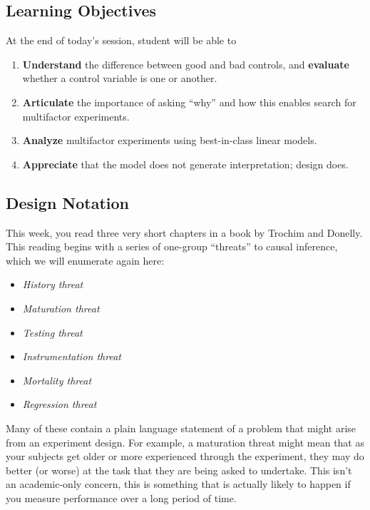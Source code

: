 \documentclass[
]{article}
\providecommand{\tightlist}{%
  \setlength{\itemsep}{0pt}\setlength{\parskip}{0pt}}
\theoremstyle{definition}
\theoremstyle{definition}
\theoremstyle{definition}
\theoremstyle{definition}
\theoremstyle{remark}
\begin{document}
\subsection{Learning Objectives}\label{learning-objectives-6}

At the end of today's session, student will be able to

\begin{enumerate}
\def\labelenumi{\arabic{enumi}.}
\tightlist
\item
  \textbf{Understand} the difference between good and bad controls, and \textbf{evaluate} whether a control variable is one or another.
\item
  \textbf{Articulate} the importance of asking ``why'' and how this enables search for multifactor experiments.
\item
  \textbf{Analyze} multifactor experiments using best-in-class linear models.
\item
  \textbf{Appreciate} that the model does not generate interpretation; design does.
\end{enumerate}

\subsection{Design Notation}\label{design-notation}

This week, you read three very short chapters in a book by Trochim and Donelly. This reading begins with a series of one-group ``threats'' to causal inference, which we will enumerate again here:

\begin{itemize}
\tightlist
\item
  \emph{History threat}
\item
  \emph{Maturation threat}
\item
  \emph{Testing threat}
\item
  \emph{Instrumentation threat}
\item
  \emph{Mortality threat}
\item
  \emph{Regression threat}
\end{itemize}

Many of these contain a plain language statement of a problem that might arise from an experiment design. For example, a maturation threat might mean that as your subjects get older or more experienced through the experiment, they may do better (or worse) at the task that they are being asked to undertake. This isn't an academic-only concern, this is something that is actually likely to happen if you measure performance over a long period of time.
\end{document}
